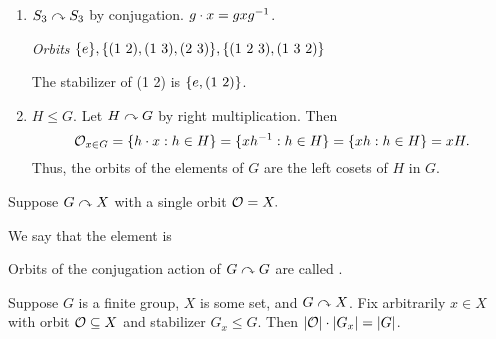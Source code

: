 \documentclass[notes.tex]{subfiles}
\begin{document}
\begin{eg}
\begin{enumerate}
\begin{proof}
				Thus, $gx\inv x = x\inv x$ (as $X = G$), so $g = e_G$.
			\end{proof}
		\item
			$S_3\curvearrowright S_3$ by conjugation. $g\cdot x = gx{g}^{-1}$.

			\emph{Orbits} $\{e\}, \{\text{(1 2)}, \text{(1 3)}, \text{(2 3)}\}, \{\text{(1 2 3)}, \text{(1 3 2)}\}$

			The stabilizer of (1 2) is $\{e, \text{(1 2)}\}$.
		\item
			$H\le G$. Let $H\curvearrowright G$ by right multiplication. 
			Then 
			$$\mathcal{O}_{x\in G} = \{h\cdot x : h\in H\} = \{x{h}^{-1}: h\in H\} = \{xh : h\in H\} = xH.$$
			Thus, the orbits of the elements of $G$ are the left cosets of $H$ in $G$.
	\end{enumerate}
\end{eg}

\begin{defn}
	Suppose $G\curvearrowright X$ with a single orbit $\mathcal{O} = X.$

	We say that the element is 
\end{defn}

\begin{defn}
	Orbits of the conjugation action of $G\curvearrowright G$ are called .
\end{defn}

\begin{theorem}
	\label{OST}
	Suppose $G$ is a finite group, $X$ is some set, and $G\curvearrowright X$. Fix arbitrarily $x\in X$ with orbit $\mathcal{O} \subseteq X$ and stabilizer $G_x \le G.$ Then $|\mathcal{O}|\cdot|G_x| = |G|$.
\end{theorem}
\end{document}
